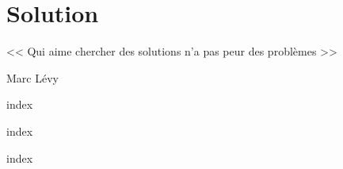 \chapter{Solution}

\epigraph{<< Qui aime chercher des solutions n'a pas peur des problèmes >>}{Marc Lévy}

{index}

{index}

{index}

